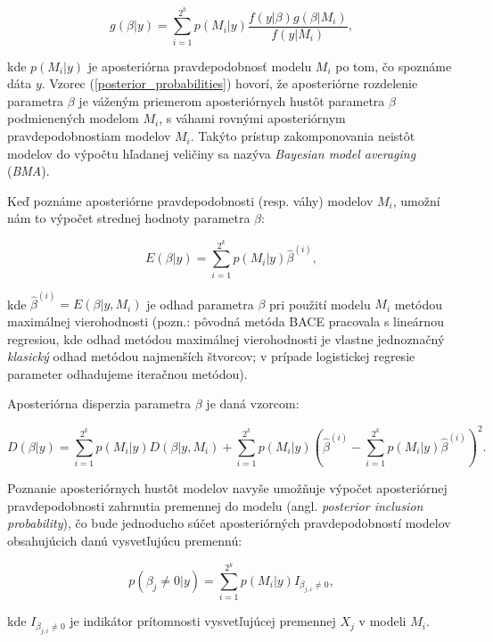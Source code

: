 \begin{equation} \label{posterior_probabilities}
    g(\beta | y) = \sum_{i = 1}^{2^k} p(M_i | y) \frac{f(y | \beta) g(\beta | M_i)}{f(y | M_i)},
\end{equation}

kde \(p(M_i|y)\) je aposteriórna pravdepodobnosť modelu \(M_i\) po tom, čo spoznáme dáta \(y\).
Vzorec (\ref{posterior_probabilities}) hovorí, že aposteriórne rozdelenie parametra \(\beta\) je váženým priemerom aposteriórnych hustôt parametra \(\beta\) podmienených modelom \(M_i\),
s váhami rovnými aposteriórnym pravdepodobnostiam modelov \(M_i\).
Takýto prístup zakomponovania neistôt modelov do výpočtu hľadanej veličiny sa nazýva \emph{Bayesian model averaging} (\emph{BMA}).

Keď poznáme aposteriórne pravdepodobnosti (resp. váhy) modelov \( M_i \), umožní nám to výpočet strednej hodnoty parametra \( \beta \):

\begin{equation} \label{posterior_expected_value}
    E(\beta | y) = \sum_{i = 1}^{2^k} p(M_i | y) \hat{\beta}^{(i)},
\end{equation}

kde \( \hat{\beta}^{(i)} = E(\beta |y, M_i) \) je odhad parametra \( \beta \) pri použití modelu \( M_i \) metódou maximálnej vierohodnosti
(pozn.: pôvodná metóda BACE pracovala s lineárnou regresiou, kde odhad metódou maximálnej vierohodnosti je vlastne jednoznačný \emph{klasický} odhad metódou najmenších štvorcov;
v prípade logistickej regresie parameter odhadujeme iteračnou metódou).

Aposteriórna disperzia parametra \(\beta\) je daná vzorcom:

\[
    D(\beta | y) = \sum_{i = 1}^{2^k} p(M_i | y) D(\beta | y, M_i) + \sum_{i = 1}^{2^k} p(M_i | y) \left( \hat{\beta}^{(i)} - \sum_{i = 1}^{2^k} p(M_i | y) \hat{\beta}^{(i)} \right)^2.
\]

Poznanie aposteriórnych hustôt modelov navyše umožňuje výpočet aposteriórnej pravdepodobnosti zahrnutia premennej do modelu (angl. \emph{posterior inclusion probability}),
čo bude jednoducho súčet aposteriórných pravdepodobností modelov obsahujúcich danú vysvetľujúcu premennú:

\begin{equation} \label{posterior_inclusion_probability}
    p(\beta_j \neq 0 | y) = \sum_{i = 1}^{2^k} p(M_i | y) I_{\beta_{j, i} \neq 0},
\end{equation}

kde \( I_{\beta_{j, i} \neq 0} \) je indikátor prítomnosti vysvetľujúcej premennej \( X_j \) v modeli \( M_i \).

